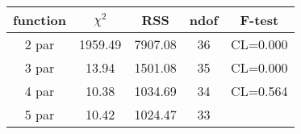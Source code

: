 \begin{tabular}{c|c|c|c|c}
function & $\chi^2$ & RSS & ndof & F-test \\
\hline
2 par & 1959.49 & 7907.08 & 36 & CL=0.000 \\
3 par & 13.94 & 1501.08 & 35 & CL=0.000 \\
4 par & 10.38 & 1034.69 & 34 & CL=0.564 \\
5 par & 10.42 & 1024.47 & 33 & \\
\hline
\end{tabular}